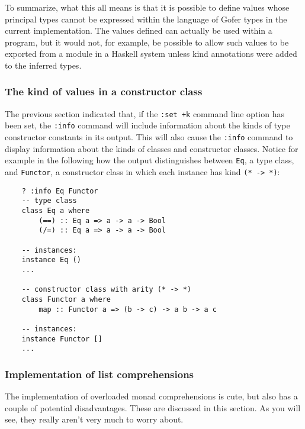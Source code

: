 To summarize, what this all means is that it is possible to define
values whose principal types cannot be expressed within the language of
Gofer types in the current implementation.  The values defined can
actually be used within a program, but it would not, for example, be
possible to allow such values to be exported from a module in a Haskell
system unless kind annotations were added to the inferred types.


\subsubsection{The kind of values in a constructor class}
The previous section indicated that, if the \verb":set +k" command line option
has been set, the \verb":info" command will include information about the
kinds of type constructor constants in its output.  This will also
cause the \verb":info" command to display information about the kinds of
classes and constructor classes.  Notice for example in the following
how the output distinguishes between \verb"Eq", a type class, and \verb"Functor", a
constructor class in which each instance has kind \verb"(* -> *)":
\begin{verbatim}
    ? :info Eq Functor
    -- type class
    class Eq a where
        (==) :: Eq a => a -> a -> Bool
        (/=) :: Eq a => a -> a -> Bool

    -- instances:
    instance Eq ()
    ...

    -- constructor class with arity (* -> *)
    class Functor a where
        map :: Functor a => (b -> c) -> a b -> a c

    -- instances:
    instance Functor []
    ...
\end{verbatim}


\subsubsection{Implementation of list comprehensions}
The implementation of overloaded monad comprehensions is cute, but also
has a couple of potential disadvantages.  These are discussed in this
section.  As you will see, they really aren't very much to worry
about.

